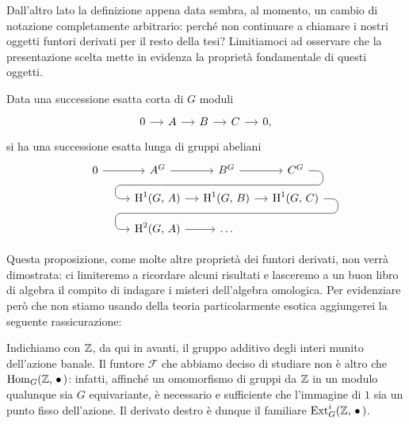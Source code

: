 Dall'altro lato la definizione appena data sembra, al momento, un cambio di notazione completamente arbitrario: perché non continuare a chiamare i nostri oggetti funtori derivati per il resto della tesi? Limitiamoci ad osservare che la presentazione scelta mette in evidenza la proprietà fondamentale di questi oggetti.

\begin{theorem}\label{fond}
	Data una successione esatta corta di $ G $ moduli
	\[\begin{tikzcd}[column sep = small]
	0 \rar & A \rar & B \rar & C \rar & 0,
	\end{tikzcd}\]
	si ha una successione esatta lunga di gruppi abeliani
	\[\begin{tikzcd}[column sep = small, row sep = small]
	0 \rar
	&A^G \rar\arrow[d,phantom, ""{coordinate, name=A, near end}]
	& B^G \arrow[d,phantom, ""{coordinate, name=B}] \rar
	& C^G \arrow[dll, 
	rounded corners = 5 pt, 
	to path={ --([xshift=3ex]\tikztostart.east)
		|- (A)\tikztonodes
		-| ([xshift=-3ex]\tikztotarget.west)
		-- (\tikztotarget)}]  \\
	\qquad \quad
	&\HH^1(G, \, A)  \arrow[d,phantom, ""{coordinate, name=X}] \rar 
	& \HH^1(G, \, B) \arrow[d,phantom, ""{coordinate, name=Y}] \rar
	& \HH^1(G, \, C) \arrow[d,phantom, ""{coordinate, name=Z}] \arrow[dll, 
	rounded corners = 5 pt, 
	to path={ --([xshift=3ex]\tikztostart.east)
		|- (X)\tikztonodes
		-| ([xshift=-3ex]\tikztotarget.west)
		-- (\tikztotarget)}]  \\
	&\HH^2(G, \, A) \rar
	& \dots
	& \qquad \end{tikzcd}\]
\end{theorem}

Questa proposizione, come molte altre proprietà dei funtori derivati, non verrà dimostrata: ci limiteremo a ricordare alcuni risultati e lasceremo a un buon libro di algebra \cite{Weibel} il compito di indagare i misteri dell'algebra omologica. Per evidenziare però che non stiamo usando della teoria particolarmente esotica aggiungerei la seguente rassicurazione:

\begin{remark}
	Indichiamo con $ \mathbb{Z} $, da qui in avanti, il gruppo additivo degli interi munito dell'azione banale.  Il funtore $ \mathcal{F} $ che abbiamo deciso di studiare non è altro che $ \operatorname{Hom}_G(\mathbb{Z},\, \bullet\,) $: infatti, affinché un omomorfismo di gruppi da $ \mathbb{Z} $ in un modulo qualunque sia $ G $ equivariante, è necessario e sufficiente che l'immagine di $ 1 $ sia un punto fisso dell'azione. Il derivato destro è dunque il familiare $ \operatorname{Ext}^i_G(\mathbb{Z}, \, \bullet\,) $.
\end{remark}

